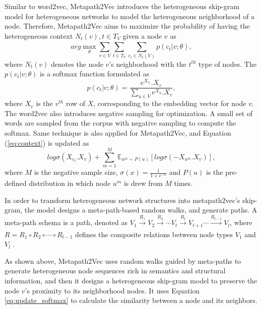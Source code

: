 Similar to word2vec, Metapath2Vec introduces the heterogeneous skip-gram model for heterogeneous networks to model the heterogeneous neighborhood of a node. Therefore, Metapath2Vec aims to maximize the probability of having the heterogeneous context $N_{t}(v), t \in T_{V}$ given a node $v$ as
\begin{equation}
    arg \max_{\theta} \sum_{v \in V}^{} \sum_{t \in T_{V} }^{} \sum_{c_{t} \in N_{t}(V)}^{} p(c_{t}|v;\theta),
\label{eq:context}
\end{equation}
\noindent where $N_{t}(v)$ denotes the node $v$'s neighborhood with the $t^{th}$ type of nodes. The $p(c_{t}|v;\theta)$ is a softmax function \cite{bengio2013representation, mikolov2013distributed} formulated as
\begin{equation}
    p(c_{t}|v;\theta) = \frac{e^{X_{c_{t}}}.X_{v}}{\sum_{u \in V}^{} e^{X_{u}}.X_{v}},
\label{eq:softmax}
\end{equation}
\noindent where $X_{v}$ is the $v^{th}$ row of $X$, corresponding to the embedding vector for node $v$. The word2vec also introduces negative sampling \cite{mikolov2013distributed} for optimization. A small set of words are sampled from the corpus with negative sampling to compute the softmax. Same technique is also applied for Metapath2Vec, and Equation (\ref{eq:context}) is updated as
\begin{equation}
    log\sigma(X_{c_{t}}.X_{v}) + \sum_{m=1}^{M} \mathbb{E}_{u^{m}\sim P(u)}[log\sigma(-X_{u^{m}}.X_{v})],
\label{eq:update_softmax}
\end{equation}
\noindent where $M$ is the negative sample size, $\sigma (x) = \frac{1}{1+e^{-x}}$ and $P(u)$ is the pre-defined distribution in which node $u^{m}$ is drew from $M$ times.

In order to transform heterogeneous network structures into metapath2vec's skip-gram, the model designs a meta-path-based random walks, and generate paths. A meta-path schema is a path, denoted as $V_{1} \xrightarrow[]{R_{1}} V_{2} \xrightarrow[]{R_{2}}\cdots V_{t} \xrightarrow[]{R_{t}} V_{t+1} \cdots \xrightarrow[]{R_{l-1}} V_{l}$, where $R = R_{1} \circ R_{2} \circ \cdots \circ R_{l-1}$ defines the composite relations between node types $V_{1}$ and $V_{l}$ \cite{sun2012mining}.

As shown above, Metapath2Vec uses random walks guided by meta-paths to generate heterogeneous node sequences rich in semantics and structural information, and then it designs a heterogeneous skip-gram model to preserve the node $v$'s proximity to its neighborhood nodes. It uses Equation \ref{eq:update_softmax} to calculate the similarity between a node and its neighbors.

